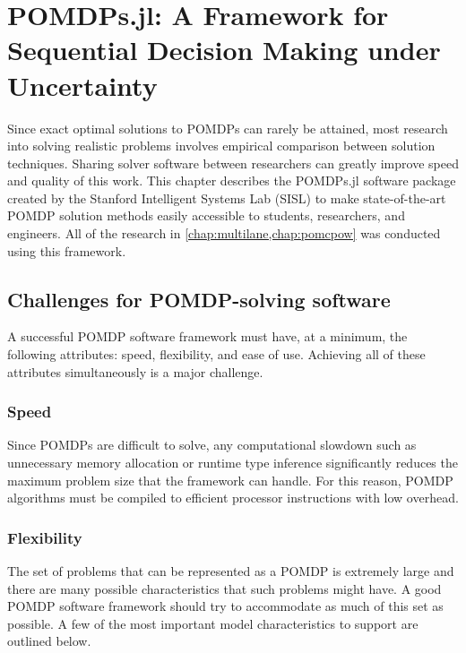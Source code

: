 \chapter{POMDPs.jl: A Framework for Sequential Decision Making under Uncertainty} \label{chap:pomdpsjl}

Since exact optimal solutions to POMDPs can rarely be attained, most research into solving realistic problems involves empirical comparison between solution techniques.
Sharing solver software between researchers can greatly improve speed and quality of this work.
This chapter describes the POMDPs.jl software package created by the Stanford Intelligent Systems Lab (SISL) to make state-of-the-art POMDP solution methods easily accessible to students, researchers, and engineers.
All of the research in \cref{chap:multilane,chap:pomcpow} was conducted using this framework.


\section{Challenges for POMDP-solving software}

A successful POMDP software framework must have, at a minimum, the following attributes: speed, flexibility, and ease of use. Achieving all of these attributes simultaneously is a major challenge.

\subsection{Speed}

Since POMDPs are difficult to solve, any computational slowdown such as unnecessary memory allocation or runtime type inference significantly reduces the maximum problem size that the framework can handle.
For this reason, POMDP algorithms must be compiled to efficient processor instructions with low overhead.

\subsection{Flexibility}

The set of problems that can be represented as a POMDP is extremely large and there are many possible characteristics that such problems might have.
A good POMDP software framework should try to accommodate as much of this set as possible.
A few of the most important model characteristics to support are outlined below.

